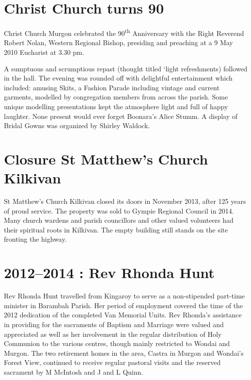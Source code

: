 \hypertarget{christ-church-turns-90}{%
\section{Christ Church turns 90}\label{christ-church-turns-90}}

Christ Church Murgon celebrated the 90\textsuperscript{th} Anniversary with the Right Reverend Robert Nolan, Western Regional Bishop, presiding and preaching at a 9 May 2010 Eucharist at 3.30 pm.

A sumptuous and scrumptious repast (thought titled `light refreshments) followed in the hall. The evening was rounded off with delightful entertainment which included: amusing Skits, a Fashion Parade including vintage and current garments, modelled by congregation members from across the parish. Some unique modelling presentations kept the atmosphere light and full of happy laughter. None present would ever forget Boonara's Alice Stumm. A display of Bridal Gowns was organized by Shirley Waldock.

\hypertarget{closure-st-matthews-church-kilkivan}{%
\section{Closure St Matthew's Church Kilkivan}\label{closure-st-matthews-church-kilkivan}}

St Matthew's Church Kilkivan closed its doors in November 2013, after 125 years of proud service. The property was sold to Gympie Regional Council in 2014. Many church wardens and parish councillors and other valued volunteers had their spiritual roots in Kilkivan. The empty building still stands on the site fronting the highway.

\hypertarget{rev-rhonda-hunt}{%
\section{2012--2014 : Rev Rhonda Hunt}\label{rev-rhonda-hunt}}

Rev Rhonda Hunt travelled from Kingaroy to serve as a non-stipended part-time minister in Barambah Parish. Her period of employment covered the time of the 2012 dedication of the completed Van Memorial Units. Rev Rhonda's assistance in providing for the sacraments of Baptism and Marriage were valued and appreciated as well as her involvement in the regular distribution of Holy Communion to the various centres, though mainly restricted to Wondai and Murgon. The two retirement homes in the area, Castra in Murgon and Wondai's Forest View, continued to receive regular pastoral visits and the reserved sacrament by M McIntosh and J and L Quinn.

